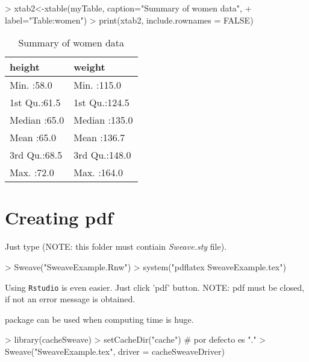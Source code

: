 \documentclass[11pt]{article}
\begin{document}
\begin{Schunk}
\begin{Sinput}
> xtab2<-xtable(myTable, caption="Summary of women data",  
+                        label="Table:women")
> print(xtab2, include.rownames = FALSE)
\end{Sinput}
% latex table generated in R 3.0.3 by xtable 1.7-4 package
% Mon Oct  6 08:45:20 2014
\begin{table}[ht]
\centering
\begin{tabular}{ll}
  \hline
    height &     weight \\ 
  \hline
Min.   :58.0   & Min.   :115.0   \\ 
  1st Qu.:61.5   & 1st Qu.:124.5   \\ 
  Median :65.0   & Median :135.0   \\ 
  Mean   :65.0   & Mean   :136.7   \\ 
  3rd Qu.:68.5   & 3rd Qu.:148.0   \\ 
  Max.   :72.0   & Max.   :164.0   \\ 
   \hline
\end{tabular}
\caption{Summary of women data} 
\label{Table:women}
\end{table}\end{Schunk}


\section{Creating pdf}

\noindent Just type  (NOTE: this folder must contiain \emph{Sweave.sty} file).

\begin{Schunk}
\begin{Sinput}
> Sweave("SweaveExample.Rnw")
> system("pdflatex SweaveExample.tex")
\end{Sinput}
\end{Schunk}

\noindent Using {\tt Rstudio} is even easier. Just click 'pdf' button. NOTE: pdf must be closed, if not an error message is obtained.


 package can be used when computing time is huge. 

\begin{Schunk}
\begin{Sinput}
> library(cacheSweave)
> setCacheDir("cache") # por defecto es "." 
> Sweave("SweaveExample.tex", driver = cacheSweaveDriver)
\end{Sinput}
\end{Schunk}
\end{document}
